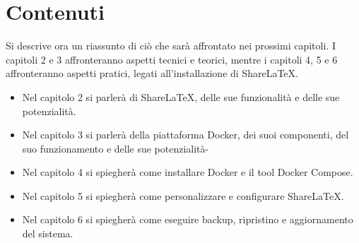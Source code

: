 \section{Contenuti}
Si descrive ora un riassunto di ciò che sarà affrontato nei prossimi capitoli. I capitoli 2 e 3 affronteranno aspetti tecnici e teorici, mentre i capitoli 4, 5 e 6 affronteranno aspetti pratici, legati all'installazione di ShareLaTeX.
\begin{itemize}
    \item Nel capitolo 2 si parlerà di ShareLaTeX, delle sue funzionalità e delle sue potenzialità.
    \item Nel capitolo 3 si parlerà della piattaforma Docker, dei suoi componenti, del suo funzionamento e delle sue potenzialità-
    \item Nel capitolo 4 si spiegherà come installare Docker e il tool Docker Compose.
    \item Nel capitolo 5 si spiegherà come personalizzare e configurare ShareLaTeX.
    \item Nel capitolo 6 si spiegherà come eseguire backup, ripristino e aggiornamento del sistema.
\end{itemize}

